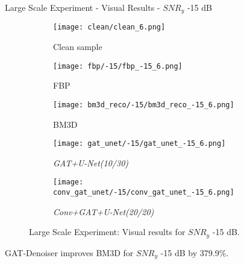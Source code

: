 \begin{frame}{Large Scale Experiment - Visual Results - $SNR_y$ -15 dB}
    \begin{figure}
        \captionsetup[subfigure]{justification=centering}
        \centering
        \begin{subfigure}[t]{0.18\textwidth}
          \texttt{[image: clean/clean\_6.png]}
          \caption{Clean sample}
        \end{subfigure} \hfill
        \begin{subfigure}[t]{0.18\textwidth}
          \texttt{[image: fbp/-15/fbp\_-15\_6.png]}
          \caption{FBP}
        \end{subfigure} \hfill
        \begin{subfigure}[t]{0.18\textwidth}
          \texttt{[image: bm3d\_reco/-15/bm3d\_reco\_-15\_6.png]}
          \caption{BM3D}
        \end{subfigure} \hfill
        \begin{subfigure}[t]{0.18\textwidth}
          \texttt{[image: gat\_unet/-15/gat\_unet\_-15\_6.png]}
          \caption{\textit{GAT+U-Net(10/30)}}
        \end{subfigure} \hfill
        \begin{subfigure}[t]{0.18\textwidth}
          \texttt{[image: conv\_gat\_unet/-15/conv\_gat\_unet\_-15\_6.png]}
          \caption{\textit{Conv+GAT+U-Net(20/20)}}
        \end{subfigure} \hfill
        \caption{Large Scale Experiment: Visual results for $SNR_y$ -15 dB.}
      \end{figure}
      
    
      \begin{tcolorbox}[colback=red!5!white,hide=<1>, alert=<2>, colframe=red!75!black]
        GAT-Denoiser improves BM3D for $SNR_y$ -15 dB by 379.9\%.
        \end{tcolorbox}
        
\end{frame}
